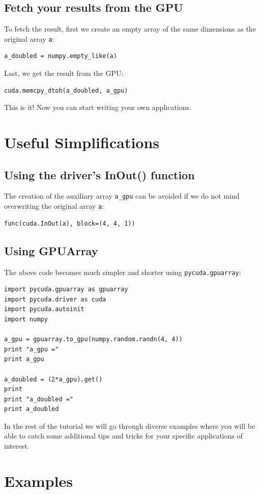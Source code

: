 \documentclass[article,A4,12pt]{llncs}
\begin{document}
\subsection{Fetch your results from the GPU}

To fetch the result, first we create an empty array of the same dimensions
as the original array {\tt a}:
\begin{verbatim}
a_doubled = numpy.empty_like(a)
\end{verbatim}
Last, we get the result from the GPU:
\begin{verbatim}
cuda.memcpy_dtoh(a_doubled, a_gpu)
\end{verbatim}
This is it! Now you can start writing your own applications.

\section{Useful Simplifications}

\subsection{Using the driver's InOut() function}

The creation of the auxiliary array {\tt a\_gpu} can be avoided if we do not 
mind overwriting the original array {\tt a}:
\begin{verbatim}
func(cuda.InOut(a), block=(4, 4, 1))
\end{verbatim}

\subsection{Using GPUArray}

The above code becomes much simpler and shorter using {\tt pycuda.gpuarray}:

\begin{verbatim}
import pycuda.gpuarray as gpuarray
import pycuda.driver as cuda
import pycuda.autoinit
import numpy

a_gpu = gpuarray.to_gpu(numpy.random.randn(4, 4))
print "a_gpu ="
print a_gpu

a_doubled = (2*a_gpu).get()
print
print "a_doubled ="
print a_doubled
\end{verbatim}
In the rest of the tutorial we will go through diverse examples where
you will be able to catch some additional tips and tricks for your 
specific applications of interest.

\section{Examples}
\end{document}
